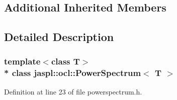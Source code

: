 \subsection*{Additional Inherited Members}


\subsection{Detailed Description}
\subsubsection*{template$<$class T$>$\\*
class jaspl\+::ocl\+::\+Power\+Spectrum$<$ T $>$}



Definition at line 23 of file powerspectrum.\+h.

